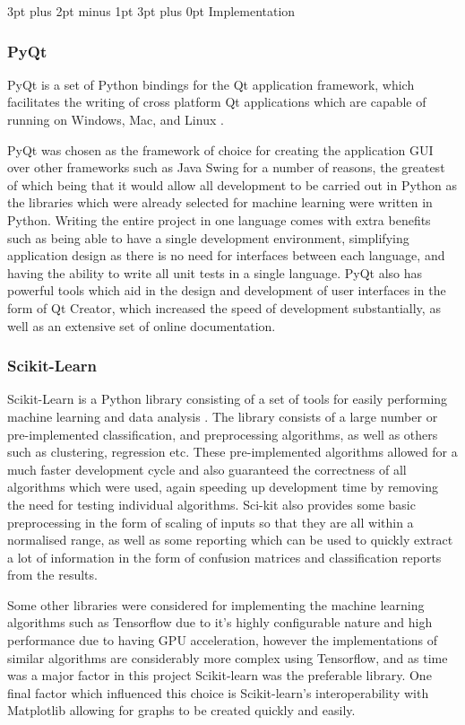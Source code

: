 \documentclass[12pt,a4paper]{article}
\makeatletter
\renewcommand\subsection{\@startsection {subsection}{1}{2mm} %
      {3pt plus 2pt minus 1pt} %
      {3pt plus 0pt} %
      {\normalfont\bfseries}}
\makeatother
\begin{document}
\subsection{Implementation}
\subsubsection{PyQt}
PyQt is a set of Python bindings for the Qt application framework, which facilitates the writing of cross platform Qt applications which are capable of running on Windows, Mac, and Linux \parencite{pyqt5}.

PyQt was chosen as the framework of choice for creating the application GUI over other frameworks such as Java Swing for a number of reasons, the greatest of which being that it would allow all development to be carried out in Python as the libraries which were already selected for machine learning were written in Python. Writing the entire project in one language comes with extra benefits such as being able to have a single development environment, simplifying application design as there is no need for interfaces between each language, and having the ability to write all unit tests in a single language. PyQt also has powerful tools which aid in the design and development of user interfaces in the form of Qt Creator, which increased the speed of development substantially, as well as an extensive set of online documentation.

\subsubsection{Scikit-Learn}
Scikit-Learn is a Python library consisting of a set of tools for easily performing machine learning and data analysis \parencite{scikit}. The library consists of a large number or pre-implemented classification, and preprocessing algorithms, as well as others such as clustering, regression etc. These pre-implemented algorithms allowed for a much faster development cycle and also guaranteed the correctness of all algorithms which were used, again speeding up development time by removing the need for testing individual algorithms. Sci-kit also provides some basic preprocessing in the form of scaling of inputs so that they are all within a normalised range, as well as some reporting which can be used to quickly extract a lot of information in the form of confusion matrices and classification reports from the results.
	
	Some other libraries were considered for implementing the machine learning algorithms such as Tensorflow due to it's highly configurable nature and high performance due to having GPU acceleration, however the implementations of similar algorithms are considerably more complex using Tensorflow, and as time was a major factor in this project Scikit-learn was the preferable library. One final factor which influenced this choice is Scikit-learn's interoperability with Matplotlib allowing for graphs to be created quickly and easily.
\end{document}
